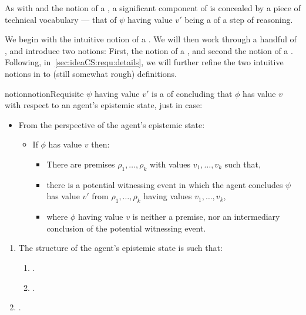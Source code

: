 \begin{note}
  As with \ideaS{} and the notion of a \emph{\sink{}}, a significant component of \ideaCS{} is concealed by a piece of technical vocabulary --- that of \(\psi\) having value \(v'\) being a \emph{\requ{}} of a step of reasoning.

  We begin with the intuitive notion of a \requ{}.
  We will then work through a handful of , and introduce two notions:
  First, the notion of a \crequ{}, and second the notion of a \prequ{}.
  Following, in~\autoref{sec:ideaCS:requ:details}, we will further refine the two intuitive notions in to (still somewhat rough) definitions.

  \begin{restatable}{notion}{notionRequisite}
    \label{notion:requ}
    \(\psi\) having value \(v'\) is a \requ{} of concluding that \(\phi\) has value \(v\) with respect to an agent's epistemic state, just in case:

    \begin{itemize}
    \item From the perspective of the agent's epistemic state:
    \begin{itemize}
    \item If \(\phi\) has value \(v\) then:
      \begin{itemize}
      \item There are premises \(\rho_{1},\dots,\rho_{k}\) with values \(v_{1},\dots,v_{k}\) such that,
      \item there is a potential witnessing event in which the agent concludes \(\psi\) has value \(v'\) from \(\rho_{1},\dots,\rho_{k}\) having values \(v_{1},\dots,v_{k}\),
      \item where \(\phi\) having value \(v\) is neither a premise, nor an intermediary conclusion of the potential witnessing event.
      \end{itemize}
    \end{itemize}
  \end{itemize}
  \vspace{-\baselineskip}
  \end{restatable}

  {
    \color{red}
    \begin{enumerate}[label=\arabic*., ref=\named{\dag \Re:\arabic*}]
    \item
      \label{notion:requ:structure}
      The structure of the agent's epistemic state is such that:
      \begin{enumerate}[label=\alph*., ref=\named{\dag \Re:1\alph*}]
      \item
        \label{notion:requ:structure:psi}
        \requNotionEpVAd{}.
      \item
        \label{notion:requ:structure:need-psi}
        \requNotionSubset{}.
      \end{enumerate}
    \item
      \label{notion:requ:possible-psi}
      \requNotionReasoningUC{}.
    \end{enumerate}
  }
\end{note}

